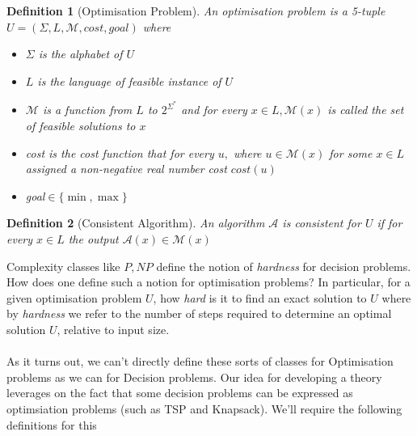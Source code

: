 \documentclass[a4paper,10pt]{article}
\newtheorem{definition}{Definition}
\begin{document}
\begin{definition}[Optimisation Problem]
    An optimisation problem is a 5-tuple $U = (\Sigma, L, \mathcal{M}, cost, goal)$ where 
    \begin{itemize}
        \item $\Sigma$ is the alphabet of $U$
        \item $L$ is the language of feasible instance of $U$
        \item $\mathcal{M}$ is a function from $L$ to $2^{\Sigma^*}$ and for every $x\in L, \mathcal{M}(x)$ is called the set of feasible solutions to $x$
        \item cost is the cost function that for every $u,$ where $u\in\mathcal{M}(x)$ for some $x\in L$ assigned a non-negative real number cost $cost(u)$
        \item goal$\in\{\min, \max\}$
    \end{itemize}
\end{definition}

\begin{definition}[Consistent Algorithm] An algorithm $\mathcal{A}$ is consistent for $U$ if for every $x\in L$ the output $\mathcal{A}(x)\in\mathcal{M}(x)$
\end{definition}

Complexity classes like $P, NP$ define the notion of \textit{hardness} for decision problems. How does one define such a notion for optimisation problems? In particular, for a given optimisation problem $U$, how \textit{hard} is it to find an exact solution to $U$ where by \textit{hardness} we refer to the number of steps required to determine an optimal solution $U$, relative to input size. \\
\\
As it turns out, we can't directly define these sorts of classes for Optimisation problems as we can for Decision problems. Our idea for developing a theory leverages on the fact that some decision problems can be expressed as optimsiation problems (such as TSP and Knapsack). We'll require the following definitions for this
\end{document}
